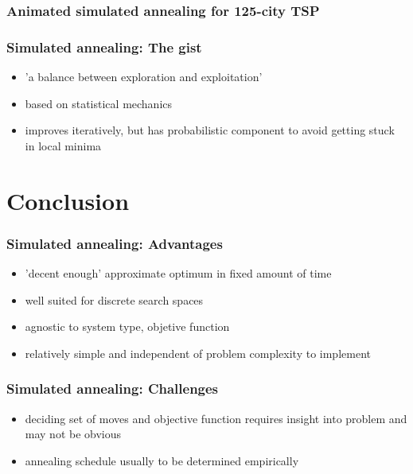 \documentclass[aspectratio=43]{beamer}
\begin{document}
\begin{frame}
	\frametitle{Animated simulated annealing for 125-city TSP}
	\begin{center}
		\cite{Geodac}
	\end{center}
\end{frame}

\begin{frame}
	\frametitle{Simulated annealing: The gist}
	\begin{center}
		\begin{itemize}
			\item<1-> \alert{'a balance between exploration and exploitation'}
			\item<1-> based on statistical mechanics
			\item<1-> improves iteratively, but has probabilistic component to avoid getting stuck in local minima
		\end{itemize}
	\end{center}
\end{frame}



\section{Conclusion}

\begin{frame}
	\frametitle{Simulated annealing: Advantages}
	\begin{center}
		\begin{itemize}
			\item<1-> \alert{'decent enough'} approximate optimum in fixed amount of time
			\item<1-> well suited for discrete search spaces
			\item<1-> agnostic to system type, objetive function
			\item<1-> relatively simple and independent of problem complexity to implement
		\end{itemize}
	\end{center}
\end{frame}

\begin{frame}
	\frametitle{Simulated annealing: Challenges}
	\begin{center}
		\begin{itemize}
			\item<1-> \alert{deciding set of moves and objective function} requires insight into problem and \alert{may not be obvious}
			\item<1-> \alert{annealing schedule} usually to be determined empirically
		\end{itemize}
	\end{center}
\end{frame}
\end{document}
